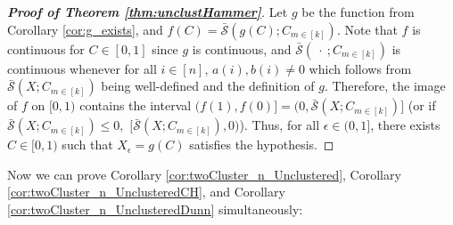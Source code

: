 \UnclustHammer*

\begin{proof}[\textbf{Proof of Theorem \ref{thm:unclustHammer}}]
    Let $g$ be the function from Corollary \ref{cor:g_exists}, and $f(C) = \bar{\mathcal{S}}(g(C); C_{m \in [k]}).$ Note that $f$ is continuous for $C \in [0,1]$ since $g$ is continuous, and $\bar{\mathcal{S}}(\ \cdot\ ; C_{m \in [k]})$ is continuous whenever for all $i\in[n]$, $a(i), b(i) \neq 0$ which follows from $\bar{\mathcal{S}}(X ; C_{m \in [k]})$ being well-defined and the definition of $g$. Therefore, the image of $f$ on $[0,1)$ contains the interval $(f(1), f(0)] = (0, \bar{\mathcal{S}}(X ; C_{m \in [k]})]$ (or if $\bar{\mathcal{S}}(X ; C_{m \in [k]}) \leq 0,$ $[\bar{\mathcal{S}}(X ; C_{m \in [k]}), 0)$). Thus, for all $\epsilon \in (0,1]$, there exists $C \in [0,1)$ such that $X_\epsilon = g(C)$ satisfies the hypothesis.
\end{proof}

Now we can prove Corollary \ref{cor:twoCluster_n_Unclustered}, Corollary \ref{cor:twoCluster_n_UnclusteredCH}, and Corollary \ref{cor:twoCluster_n_UnclusteredDunn} simultaneously: 

